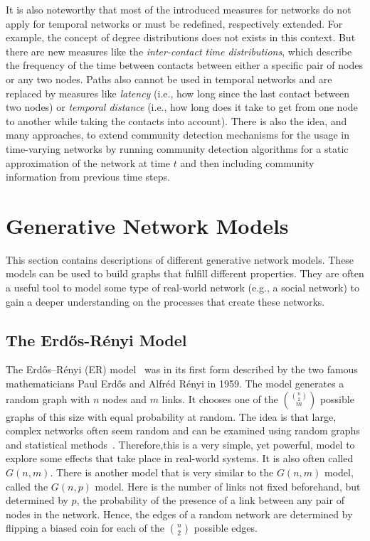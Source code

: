 It is also noteworthy that most of the introduced measures for networks do not apply for temporal networks or must be redefined, respectively extended.
For example, the concept of degree distributions does not exists in this context.
But there are new measures like the \emph{inter-contact time distributions}, which describe the frequency of the time between contacts between either a specific pair of nodes or any two nodes.
Paths also cannot be used in temporal networks and are replaced by measures like \emph{latency} (i.e., how long since the last contact between two nodes) or \emph{temporal distance} (i.e., how long does it take to get from one node to another while taking the contacts into account).
There is also the idea, and many approaches, to extend community detection mechanisms for the usage in time-varying networks by running community detection algorithms for a static approximation of the network at time \(t\) and then including community information from previous time steps.




\section{Generative Network Models}
\label{sec:network-models}

This section contains descriptions of different generative network models.
These models can be used to build graphs that fulfill different properties.
They are often a useful tool to model some type of real-world network (e.g., a social network) to gain a deeper understanding on the processes that create these networks.

\subsection{The Erdős-Rényi Model}

The Erdős–Rényi (ER) model~\cite{Erdos1959, Newman2010} was in its first form described by the two famous mathematicians Paul Erdős and Alfréd Rényi in 1959.
The model generates a random graph with \(n\) nodes and \(m\) links.
It chooses one of the \(\binom{\binom{n}{2}}{m}\) possible graphs of this size with equal probability at random.
The idea is that large, complex networks often seem random and can be examined using random graphs and statistical methods~\cite{Barabasi2002}.
Therefore,this is a very simple, yet powerful, model to explore some effects that take place in real-world systems.
It is also often called \(G(n, m)\).
There is another model that is very similar to the \(G(n, m)\) model, called the \(G(n, p)\) model.
Here is the number of links not fixed beforehand, but determined by \(p\), the probability of the presence of a link between any pair of nodes in the network.
Hence, the edges of a random network are determined by flipping a biased coin for each of the \(\binom{n}{2}\) possible edges.

